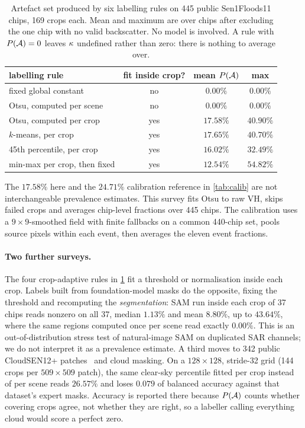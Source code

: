 \begin{table}[tb]
\centering
\scriptsize
\setlength{\tabcolsep}{1.4pt}
\begin{tabular}{lccc}
\toprule
labelling rule & fit inside crop? & mean $P(\mathcal{A})$ & max \\
\midrule
fixed global constant        & no  & $0.00\%$  & $0.00\%$ \\
Otsu, computed per scene     & no  & $0.00\%$  & $0.00\%$ \\
Otsu, computed per crop      & yes & $17.58\%$ & $40.90\%$ \\
$k$-means, per crop          & yes & $17.65\%$ & $40.70\%$ \\
45th percentile, per crop    & yes & $16.02\%$ & $32.49\%$ \\
min-max per crop, then fixed & yes & $12.54\%$ & $54.82\%$ \\
\bottomrule
\end{tabular}
\caption{Artefact set produced by six labelling rules on 445 public Sen1Floods11
chips, 169 crops each. Mean and maximum are over chips after excluding the one chip
with no valid backscatter. No model is involved. A rule with $P(\mathcal{A}) = 0$ leaves
$\kappa$ undefined rather than zero: there is nothing to average over.}
\label{tab:survey}
\end{table}

The $17.58\%$ here and the $24.71\%$ calibration reference in
\cref{tab:calib} are not interchangeable prevalence estimates. This survey fits
Otsu to raw VH, skips failed crops and averages chip-level fractions over 445 chips.
The calibration uses a $9\times9$-smoothed field with finite fallbacks on a common
440-chip set, pools source pixels within each event, then averages the eleven event
fractions.

\paragraph{Two further surveys.} The four crop-adaptive rules in \cref{tab:survey}
fit a threshold or normalisation inside each crop.
Labels built from foundation-model masks do the opposite, fixing the threshold and
recomputing the \emph{segmentation}: SAM run inside each crop of 37 chips reads nonzero
on all 37, median $1.13\%$ and mean $8.80\%$, up to $43.64\%$, where the same regions
computed once per scene read exactly $0.00\%$. This is an out-of-distribution stress
test of natural-image SAM on duplicated SAR channels; we do not interpret it as a
prevalence estimate. A
third moves to 342 public CloudSEN12+ patches~\cite{aybar2024cloudsen12plus} and cloud
masking. On a $128\times128$, stride-32 grid (144 crops per $509\times509$ patch), the
same clear-sky percentile fitted per crop instead of per scene reads $26.57\%$ and
loses $0.079$ of balanced accuracy against that dataset's expert masks. Accuracy is
reported there because $P(\mathcal{A})$ counts whether covering crops agree, not whether they
are right, so a labeller calling everything cloud would score a perfect zero.

